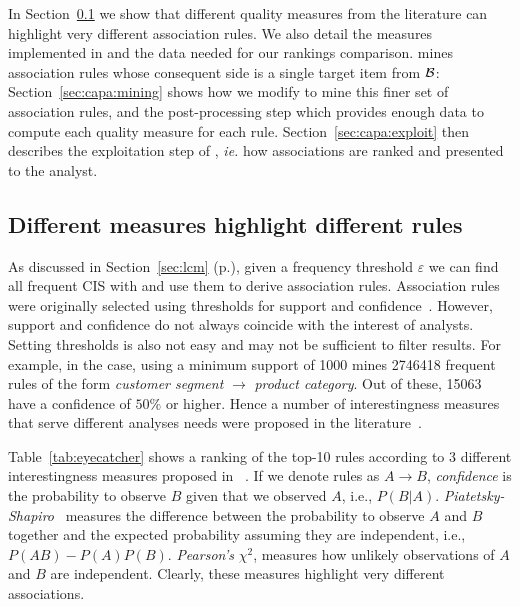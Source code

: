 In Section~\ref{sec:capa:intro} we show that different quality measures from the literature
can highlight very different association rules.
We also detail the \nbm measures implemented in \capa and the data needed for our rankings comparison.
\capa mines association rules whose consequent side is a single target item from ${\cal B}$:
Section~\ref{sec:capa:mining} shows how we modify \jlcm to mine this finer set of association rules,
and the post-processing step which provides enough data to compute each quality measure for each rule.
Section~\ref{sec:capa:exploit} then describes the exploitation step of \capa,
{\em ie.} how associations are ranked and presented to the analyst.

\subsection{Different measures highlight different rules}
\label{sec:capa:intro}

As discussed in Section~\ref{sec:lcm} (p.\pageref{sec:lcm}),
given a frequency threshold $\varepsilon$
we can find all frequent CIS with \jlcm
and use them to derive association rules.
Association rules were originally selected using thresholds for support and confidence~\cite{AgrawalSIGMOD93}.
However, support and confidence do not always coincide with the interest of analysts.
Setting thresholds is also not easy and may not be sufficient to filter results.
For example, in the \demoassoc case, using a minimum support of \num{1000} \jlcm mines \num{2746418}
frequent rules of the form {\em customer segment} $\rightarrow$ {\em product category}.
Out of these, \num{15063} have a confidence of $50\%$ or higher.
Hence a number of interestingness measures that serve different analyses needs
were proposed in the literature~\cite{GengACM06,Lenca2007}.



Table~\ref{tab:eyecatcher} shows a ranking of the top-10 rules
according to 3 different interestingness measures proposed in ~\cite{GengACM06}.
If we denote rules as $A \rightarrow B$,
{\em confidence} is the probability to observe $B$ given that we observed $A$, i.e., $P(B|A)$.
{\em Piatetsky-Shapiro}~\cite{PiatetskyKDD91} measures the difference
between the probability to observe $A$ and $B$ together
and the expected probability assuming they are independent,  i.e., $P(AB) - P(A)P(B)$.
{\em Pearson's} $\chi^2$, measures how unlikely observations of $A$ and $B$ are independent.
Clearly, these measures highlight very different associations.


